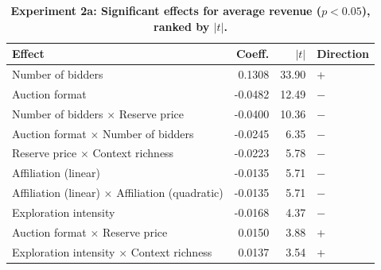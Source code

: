 \begin{table}[H]
\centering
\caption[Experiment 2a: Significant effects for average revenue ($p < 0.05$), ranked by $|t|$]{\textbf{Experiment 2a: Significant effects for average revenue ($p < 0.05$), ranked by $|t|$.}}
\label{tab:exp2a_ranked_rev}
\begin{tabular}{lrrl}
\toprule
\textbf{Effect} & \textbf{Coeff.} & \textbf{$|t|$} & \textbf{Direction} \\
\midrule
Number of bidders & 0.1308 & 33.90 & + \\
Auction format & -0.0482 & 12.49 & $-$ \\
Number of bidders $\times$ Reserve price & -0.0400 & 10.36 & $-$ \\
Auction format $\times$ Number of bidders & -0.0245 & 6.35 & $-$ \\
Reserve price $\times$ Context richness & -0.0223 & 5.78 & $-$ \\
Affiliation (linear) & -0.0135 & 5.71 & $-$ \\
Affiliation (linear) $\times$ Affiliation (quadratic) & -0.0135 & 5.71 & $-$ \\
Exploration intensity & -0.0168 & 4.37 & $-$ \\
Auction format $\times$ Reserve price & 0.0150 & 3.88 & + \\
Exploration intensity $\times$ Context richness & 0.0137 & 3.54 & + \\
\bottomrule
\end{tabular}
\end{table}
